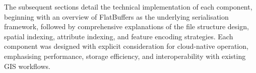 The subsequent sections detail the technical implementation of each component, beginning with an overview of FlatBuffers as the underlying serialisation framework, followed by comprehensive explanations of the file structure design, spatial indexing, attribute indexing, and feature encoding strategies. Each component was designed with explicit consideration for cloud-native operation, emphasising performance, storage efficiency, and interoperability with existing GIS workflows.
